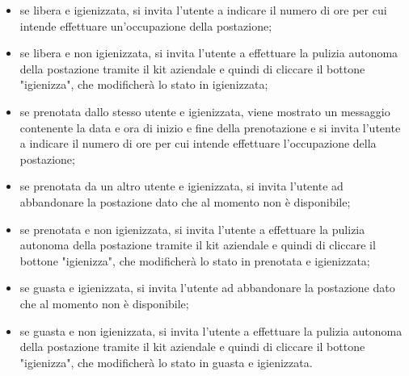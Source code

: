 	\begin{itemize}
		\item se libera e igienizzata, si invita l'utente a indicare il numero di ore per cui intende effettuare un'occupazione della postazione;
		\item se libera e non igienizzata, si invita l'utente a effettuare la pulizia autonoma della postazione tramite il kit aziendale e quindi di cliccare il bottone "igienizza", che modificherà lo stato in igienizzata;
		\item se prenotata dallo stesso utente e igienizzata, viene mostrato un messaggio contenente la data e ora di inizio e fine della prenotazione e si invita l'utente a indicare il numero di ore per cui intende effettuare l'occupazione della postazione;
		\item se prenotata da un altro utente e igienizzata, si invita l'utente ad abbandonare la postazione dato che al momento non è disponibile;
		\item se prenotata e non igienizzata, si invita l'utente a effettuare la pulizia autonoma della postazione tramite il kit aziendale e quindi di cliccare il bottone "igienizza", che modificherà lo stato in prenotata e igienizzata;
		\item se guasta e igienizzata, si invita l'utente ad abbandonare la postazione dato che al momento non è disponibile;
		\item se guasta e non igienizzata, si invita l'utente a effettuare la pulizia autonoma della postazione tramite il kit aziendale e quindi di cliccare il bottone "igienizza", che modificherà lo stato in guasta e igienizzata.
	\end{itemize}
	
